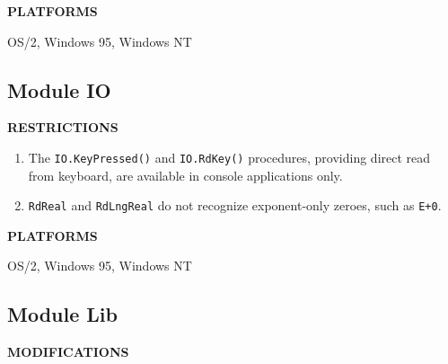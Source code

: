 {\bf PLATFORMS}

  OS/2, Windows 95, Windows NT


\subsection{Module IO}

{\bf RESTRICTIONS}

\begin{enumerate}
\item The \verb'IO.KeyPressed()' and \verb'IO.RdKey()' procedures,
      providing direct read from keyboard, are available in console
      applications only.

\item \verb'RdReal' and \verb'RdLngReal' do not recognize exponent-only zeroes,
      such as \verb'E+0'.
\end{enumerate}

{\bf PLATFORMS}

  OS/2, Windows 95, Windows NT


\subsection{Module Lib}

{\bf MODIFICATIONS}

